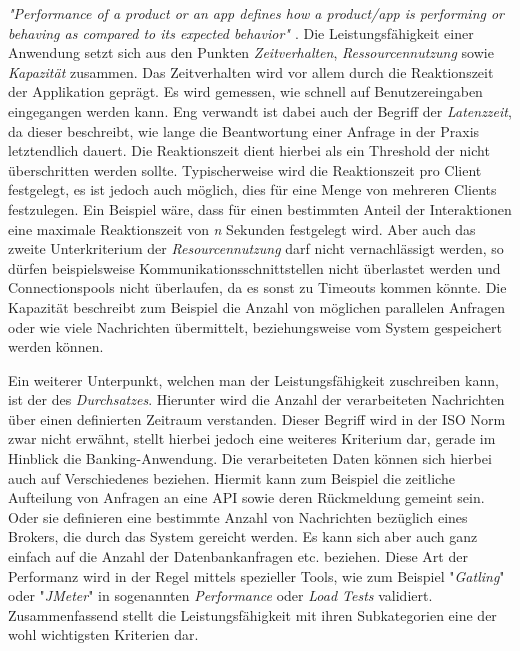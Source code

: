 \emph{"Performance of a product or an app defines how a product/app is performing or behaving as compared to its expected behavior" \cite{nfr-dotnetcurry}}. Die Leistungsfähigkeit einer Anwendung setzt sich aus den Punkten \emph{Zeitverhalten}, \emph{Ressourcennutzung} sowie \emph{Kapazität} zusammen. Das Zeitverhalten wird vor allem durch die Reaktionszeit der Applikation geprägt. Es wird gemessen, wie schnell auf Benutzereingaben eingegangen werden kann. Eng verwandt ist dabei auch der Begriff der \emph{Latenzzeit}, da dieser beschreibt, wie lange die Beantwortung einer Anfrage in der Praxis letztendlich dauert. Die Reaktionszeit dient hierbei als ein Threshold der nicht überschritten werden sollte. Typischerweise wird die Reaktionszeit pro Client festgelegt, es ist jedoch auch möglich, dies für eine Menge von mehreren Clients festzulegen. Ein Beispiel wäre, dass für einen bestimmten Anteil der Interaktionen eine maximale Reaktionszeit von \emph{n} Sekunden festgelegt wird. Aber auch das zweite Unterkriterium der \emph{Resourcennutzung} darf nicht vernachlässigt werden, so dürfen beispielsweise Kommunikationsschnittstellen nicht überlastet werden und Connectionspools nicht überlaufen, da es sonst zu Timeouts kommen könnte. Die Kapazität beschreibt zum Beispiel die Anzahl von möglichen parallelen Anfragen oder wie viele Nachrichten übermittelt, beziehungsweise vom System gespeichert werden können. 

Ein weiterer Unterpunkt, welchen man der Leistungsfähigkeit zuschreiben kann, ist der des \emph{Durchsatzes}. Hierunter wird die Anzahl der verarbeiteten Nachrichten über einen definierten Zeitraum verstanden. Dieser Begriff wird in der ISO Norm zwar nicht erwähnt, stellt hierbei jedoch eine weiteres Kriterium dar, gerade im Hinblick die Banking-Anwendung. Die verarbeiteten Daten können sich hierbei auch auf Verschiedenes beziehen. Hiermit kann zum Beispiel die zeitliche Aufteilung von Anfragen an eine API sowie deren Rückmeldung gemeint sein. Oder sie definieren eine bestimmte Anzahl von Nachrichten bezüglich eines Brokers, die durch das System gereicht werden. Es kann sich aber auch ganz einfach auf die Anzahl der Datenbankanfragen etc. beziehen. Diese Art der Performanz wird in der Regel mittels spezieller Tools, wie zum Beispiel "\emph{Gatling}" oder "\emph{JMeter}" in sogenannten \emph{Performance} oder \emph{Load Tests} validiert. Zusammenfassend stellt die Leistungsfähigkeit mit ihren Subkategorien eine der wohl wichtigsten Kriterien dar.


